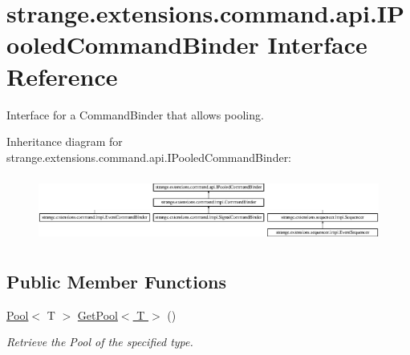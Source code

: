 \hypertarget{interfacestrange_1_1extensions_1_1command_1_1api_1_1_i_pooled_command_binder}{\section{strange.\-extensions.\-command.\-api.\-I\-Pooled\-Command\-Binder Interface Reference}
\label{interfacestrange_1_1extensions_1_1command_1_1api_1_1_i_pooled_command_binder}
}


Interface for a Command\-Binder that allows pooling.  


Inheritance diagram for strange.\-extensions.\-command.\-api.\-I\-Pooled\-Command\-Binder\-:\begin{figure}[H]
\begin{center}
\leavevmode
\includegraphics[height=2.189638cm]{interfacestrange_1_1extensions_1_1command_1_1api_1_1_i_pooled_command_binder}
\end{center}
\end{figure}
\subsection*{Public Member Functions}
\begin{DoxyCompactItemize}
\item 
\hypertarget{interfacestrange_1_1extensions_1_1command_1_1api_1_1_i_pooled_command_binder_aa3f3e5446f780deb797850b0e3ba4ba0}{\hyperlink{classstrange_1_1extensions_1_1pool_1_1impl_1_1_pool}{Pool}$<$ T $>$ \hyperlink{interfacestrange_1_1extensions_1_1command_1_1api_1_1_i_pooled_command_binder_aa3f3e5446f780deb797850b0e3ba4ba0}{Get\-Pool$<$ T $>$} ()}\label{interfacestrange_1_1extensions_1_1command_1_1api_1_1_i_pooled_command_binder_aa3f3e5446f780deb797850b0e3ba4ba0}

\begin{DoxyCompactList}\small\item\em Retrieve the Pool of the specified type. \end{DoxyCompactList}\end{DoxyCompactItemize}

